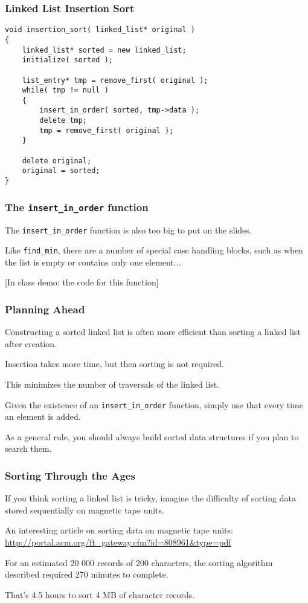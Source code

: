 \begin{frame}[fragile]
\frametitle{Linked List Insertion Sort}

\begin{verbatim}
void insertion_sort( linked_list* original )
{
    linked_list* sorted = new linked_list;
    initialize( sorted );

    list_entry* tmp = remove_first( original );
    while( tmp != null )
    {
        insert_in_order( sorted, tmp->data );
        delete tmp;
        tmp = remove_first( original );
    }
  
    delete original;
    original = sorted;
}
\end{verbatim}

\end{frame}


\begin{frame}[fragile]
\frametitle{The \texttt{insert\_in\_order} function}
The \texttt{insert\_in\_order} function is also too big to put on the slides.

Like \texttt{find\_min}, there are a number of special case handling blocks, such as when the list is empty or contains only one element...

[In class demo: the code for this function]

\end{frame}

\begin{frame}
\frametitle{Planning Ahead}

Constructing a sorted linked list is often more efficient than sorting a linked list after creation.

Insertion takes more time, but then sorting is not required.

This minimizes the number of traversals of the linked list.

Given the existence of an \texttt{insert\_in\_order} function, simply use that every time an element is added.

As a general rule, you should always build sorted data structures if you plan to search them.


\end{frame}


\begin{frame}
\frametitle{Sorting Through the Ages}
If you think sorting a linked list is tricky, imagine the difficulty of sorting data stored sequentially on magnetic tape units.

An interesting article on sorting data on magnetic tape units:
\url{http://portal.acm.org/ft_gateway.cfm?id=808961&type=pdf}
	
For an estimated 20 000 records of 200 characters, the sorting algorithm described required 270 minutes to complete.

That's 4.5 hours to sort 4 MB of character records.
\end{frame}

